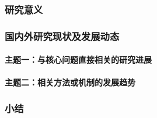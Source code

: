 
\subsubsection{研究意义}
\justifying\indent

\subsubsection{国内外研究现状及发展动态}
\indent

\paragraph{主题一：与核心问题直接相关的研究进展}

\paragraph{主题二：相关方法或机制的发展趋势}


\subsubsection{小结}
\indent
